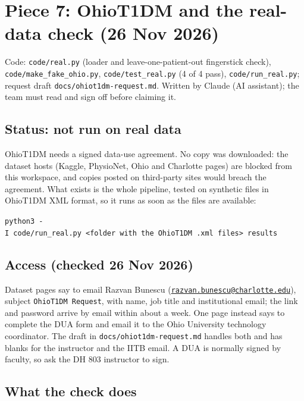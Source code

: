 \documentclass[11pt,a4paper]{article}
\begin{document}
\hypertarget{piece-7-ohiot1dm-and-the-real-data-check-26-nov-2026}{%
\section{Piece 7: OhioT1DM and the real-data check (26 Nov
2026)}\label{piece-7-ohiot1dm-and-the-real-data-check-26-nov-2026}}

Code: \texttt{code/real.py} (loader and leave-one-patient-out
fingerstick check), \texttt{code/make\_fake\_ohio.py},
\texttt{code/test\_real.py} (4 of 4 pass), \texttt{code/run\_real.py};
request draft \texttt{docs/ohiot1dm-request.md}. Written by Claude (AI
assistant); the team must read and sign off before claiming it.

\hypertarget{status-not-run-on-real-data}{%
\subsection{Status: not run on real
data}\label{status-not-run-on-real-data}}

OhioT1DM needs a signed data-use agreement. No copy was downloaded: the
dataset hosts (Kaggle, PhysioNet, Ohio and Charlotte pages) are blocked
from this workspace, and copies posted on third-party sites would breach
the agreement. What exists is the whole pipeline, tested on synthetic
files in OhioT1DM XML format, so it runs as soon as the files are
available:

\texttt{python3\ -I\ code/run\_real.py\ \textless{}folder\ with\ the\ OhioT1DM\ .xml\ files\textgreater{}\ results}

\hypertarget{access-checked-26-nov-2026}{%
\subsection{Access (checked 26 Nov
2026)}\label{access-checked-26-nov-2026}}

Dataset pages say to email Razvan Bunescu
(\href{mailto:razvan.bunescu@charlotte.edu}{\nolinkurl{razvan.bunescu@charlotte.edu}}),
subject \texttt{OhioT1DM\ Request}, with name, job title and
institutional email; the link and password arrive by email within about
a week. One page instead says to complete the DUA form and email it to
the Ohio University technology coordinator. The draft in
\texttt{docs/ohiot1dm-request.md} handles both and has blanks for the
instructor and the IITB email. A DUA is normally signed by faculty, so
ask the DH 803 instructor to sign.

\hypertarget{what-the-check-does}{%
\subsection{What the check does}\label{what-the-check-does}}
\end{document}
